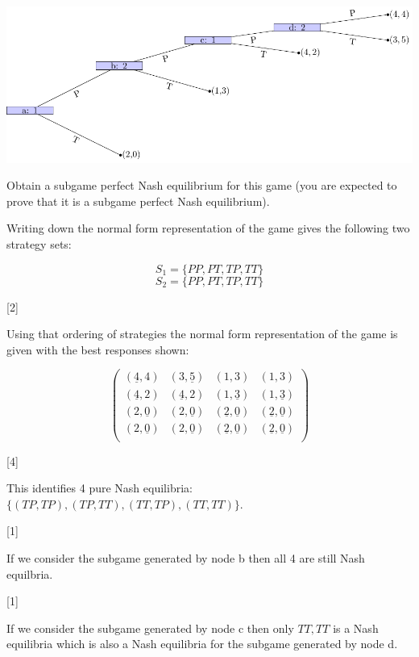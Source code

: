 \documentclass[12pt,a4paper]{article}
\begin{document}
\begin{enumerate}
\begin{enumerate}
            \begin{center}
                \includegraphics[width=.8\textwidth]{images/mock-img01.pdf}
            \end{center}

            Obtain a subgame perfect Nash equilibrium for this game (you are expected to prove that it is a subgame perfect Nash equilibrium).

            Writing down the normal form representation of the game gives the following two strategy sets:

            \[S_1=\{PP,PT,TP,TT\}\]
            \[S_2=\{PP,PT,TP,TT\}\]

            \hfill[2]

            Using that ordering of strategies the normal form representation of the game is given with the best responses shown:

            \[\begin{pmatrix}
            (\underline{4},4)&(3,\underline{5})&(1,3)&(1,3)\\
            (\underline{4},2)&(\underline{4},2)&(1,\underline{3})&(1,\underline{3})\\
            (2,\underline{0})&(2,\underline{0})&(\underline{2},\underline{0})&(\underline{2},\underline{0})\\
            (2,\underline{0})&(2,\underline{0})&(\underline{2},\underline{0})&(\underline{2},\underline{0})\\
            \end{pmatrix}\]

            \hfill[4]

            This identifies 4 pure Nash equilibria: \(\{(TP,TP),(TP,TT),(TT,TP),(TT,TT)\}\).

            \hfill[1]

            If we consider the subgame generated by node b then all 4 are still Nash equilbria.

            \hfill[1]

            If we consider the subgame generated by node c then only \(TT,TT\) is a Nash equilibria which is also a Nash equilibria for the subgame generated by node d.


\end{enumerate}
\end{enumerate}
\end{document}
